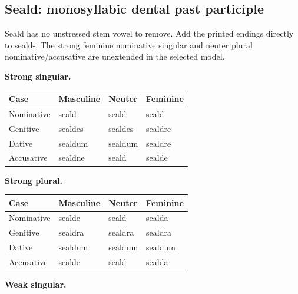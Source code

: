 \subsection*{Seald: monosyllabic dental past participle}

Seald has no unstressed stem vowel to remove. Add the printed endings directly to seald-. The strong feminine nominative singular and neuter plural nominative/\allowbreak{}accusative are unextended in the selected model.

\textbf{Strong singular.}

\par\begingroup
\fontsize{10.5}{13.2}\selectfont
\setlength{\LTleft}{0pt}\setlength{\LTright}{\fill}
\noindent
\begin{tabular}{@{}>{\raggedright\arraybackslash}p{22.0mm}>{\raggedright\arraybackslash}p{31.188mm}>{\raggedright\arraybackslash}p{31.188mm}>{\raggedright\arraybackslash}p{31.188mm}@{}}
\toprule
\textbf{Case} & \textbf{Masculine} & \textbf{Neuter} & \textbf{Feminine} \\
\midrule
Nominative & seald & seald & seald \\
Genitive & sealdes & sealdes & sealdre \\
Dative & sealdum & sealdum & sealdre \\
Accusative & sealdne & seald & sealde \\
\bottomrule
\end{tabular}
\par\endgroup
\textbf{Strong plural.}

\par\begingroup
\fontsize{10.5}{13.2}\selectfont
\setlength{\LTleft}{0pt}\setlength{\LTright}{\fill}
\noindent
\begin{tabular}{@{}>{\raggedright\arraybackslash}p{22.0mm}>{\raggedright\arraybackslash}p{31.188mm}>{\raggedright\arraybackslash}p{31.188mm}>{\raggedright\arraybackslash}p{31.188mm}@{}}
\toprule
\textbf{Case} & \textbf{Masculine} & \textbf{Neuter} & \textbf{Feminine} \\
\midrule
Nominative & sealde & seald & sealda \\
Genitive & sealdra & sealdra & sealdra \\
Dative & sealdum & sealdum & sealdum \\
Accusative & sealde & seald & sealda \\
\bottomrule
\end{tabular}
\par\endgroup
\textbf{Weak singular.}

